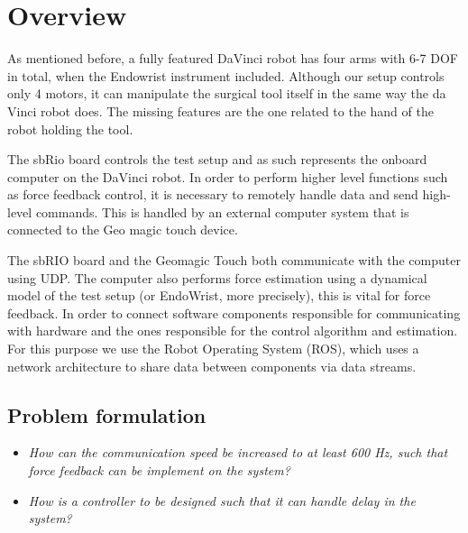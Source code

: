 \section{Overview}
As mentioned before, a fully featured DaVinci robot has four arms with 6-7 \gls{DOF} in total, when the Endowrist instrument included.
Although our setup controls only 4 motors, it can manipulate the surgical tool itself in the same way the da Vinci robot does. The missing features are the one related to the hand of the robot holding the tool.

The sbRio board controls the test setup and as such represents the onboard computer on the DaVinci robot.
In order to perform higher level functions such as force feedback control, it is necessary to remotely handle data and send high-level commands.
This is handled by an external computer system that is connected to the Geo magic touch device.

The sbRIO board and the Geomagic Touch both communicate with the computer using UDP.
The computer also performs force estimation using a dynamical model of the test setup (or EndoWrist, more precisely), this is vital for force feedback.
In order to connect software components responsible for communicating with hardware and the ones responsible for the control algorithm and estimation.
For this purpose we use the Robot Operating System (ROS), which uses a network architecture to share data between components via data streams.



\subsection*{Problem formulation}
\begin{itemize}
\item \textit{How can the communication speed be increased to at least 600 Hz, such that force feedback can be implement on the system?}
\item \textit{How is a controller to be designed such that it can handle delay in the system?}
\end{itemize}
